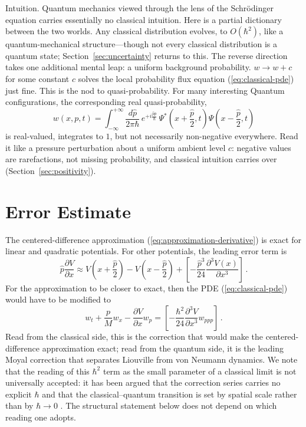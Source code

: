 \documentclass[12pt]{article}
\begin{document}
Intuition. Quantum mechanics viewed through the lens of the Schr\"odinger equation carries essentially no classical intuition.  Here is a partial dictionary between the two worlds.  Any classical distribution evolves, to $O(\hbar^2)$, like a quantum-mechanical structure---though not every classical distribution is a quantum state; Section~\ref{sec:uncertainty} returns to this.  The reverse direction takes one additional mental leap: a uniform background probability. $w \rightarrow w + c$ for some constant $c$ solves the local probability flux equation (\ref{eq:classical-pde}) just fine. This is the nod to quasi-probability. For many interesting Quantum configurations, the corresponding real quasi-probability,
\begin{equation}
w(x,p,t) = \int_{-\infty}^{+\infty} \frac{d\hat{p}}{2\pi \hbar} \, e^{+i \frac{\hat{p} p}{\hbar}} \, \Psi^*(x+\frac{\hat{p}}{2},t) \Psi(x-\frac{\hat{p}}{2},t)
\end{equation}
is real-valued, integrates to $1$, but not necessarily non-negative everywhere. Read it like a pressure perturbation about a uniform ambient level $c$: negative values are rarefactions, not missing probability, and classical intuition carries over (Section~\ref{sec:positivity}).
\section{Error Estimate}\label{sec:error}
The centered-difference approximation (\ref{eq:approximation-derivative}) is exact for linear and quadratic potentials. For other potentials, the leading error term is
\begin{equation}
\hat{p} \frac{\partial V}{\partial x}  \approx V(x+\frac{\hat{p}}{2})-V(x-\frac{\hat{p}}{2})+\left[ -\frac{\hat{p}^3}{24} \frac{\partial^3 V(x)}{\partial x^3}\right] \,.
\end{equation}
For the approximation to be closer to exact, then the PDE (\ref{eq:classical-pde})
 would have to be modified to
\begin{equation}
w_t + \frac{p}{M} w_x - \frac{\partial V}{\partial x} w_p = \left[ -\frac{\hbar^2}{24} \frac{\partial^3 V}{\partial x^3} w_{ppp} \right] \,.
\end{equation}
Read from the classical side, this is the correction that would make the centered-difference approximation exact; read from the quantum side, it is the leading Moyal correction \cite{moyal1949,zurek2003,case2008} that separates Liouville from von Neumann dynamics.
We note that the reading of this $\hbar^2$ term as the small parameter of a classical limit is not universally accepted: it has been argued that the correction series carries no explicit $\hbar$ and that the classical--quantum transition is set by spatial scale rather than by $\hbar \rightarrow 0$ \cite{perepelkin2023}.
The structural statement below does not depend on which reading one adopts.
\end{document}
